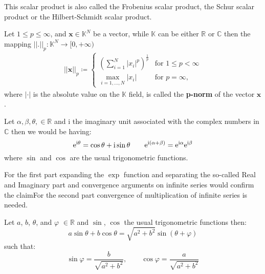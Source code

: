\noindent This scalar product is also called the Frobenius scalar product, the Schur scalar product or 
the Hilbert-Schmidt scalar product.

\begin{Def}\label{def:p-norm}
    Let $1 \leq p \leq \infty$, and $\boldsymbol{x} \in \mathbb{K}^N$ be a vector, while $\mathbb{K}$ can be either $\mathbb{R}$ or $\mathbb{C}$ then the mapping $\left|\left| \boldsymbol{.} \right|\right|_p \colon \mathbb{K}^N \to [0,+\infty)$
    \begin{equation}
        \begin{split} 
            \left|\left|\boldsymbol{x}\right|\right|_p \coloneqq    
            \begin{cases}
                \left(\sum_{i=1}^{N}\left|x_i\right|^p\right)^{\frac{1}{p}} & \text{for } 1 \leq p < \infty\\
                \underset{{i=1,\dots,N}}{\max} \left|x_i\right| & \text{for } p = \infty,
            \end{cases}
        \end{split}
    \end{equation}
    where $\left|\boldsymbol{\cdot}\right|$ is the absolute value on the $\mathbb{K}$ field,
    is called the \textbf{p-norm} of the vector $\boldsymbol{x}$.
\end{Def}
\begin{Thm}\label{theorem:euler_formula}
    Let $\alpha,\beta,\theta, \in \mathbb{R}$ and $\mathrm{i}$ the imaginary unit associated with the complex numbers in $\mathbb{C}$ 
    then we would be having:
	\begin{equation}
		\mathrm{e}^{\mathrm{i}\theta} = \cos \theta +  \mathrm{i}\sin \theta \qquad  \mathrm{e}^{\mathrm{i}(\alpha+\beta)} = \mathrm{e}^{\mathrm{i}\alpha}\mathrm{e}^{\mathrm{i}\beta}\index{Euler formula}\index{Function!$\exp$}\index{Function!$\sin$}\index{Function!$\cos$}
	\end{equation}
    where $\sin$ and $\cos$ are the usual trigonometric functions.
	\end{Thm}
	\begin{Rem}
	For the first part expanding the $\exp$ function and separating the so-called Real and Imaginary part and convergence arguments 
	on infinite series would confirm the claim\cite{Rudin1976}For the second part 
	convergence of multiplication of infinite series is needed.
	\end{Rem}
	\begin{Lem}
		Let $a$, $b$, $\theta$, and $\varphi$ $\in \mathbb{R}$ and $\sin$, $\cos$ 
        the usual trigonometric functions then:
		\begin{equation}
			a\sin \theta+b\cos \theta  = \sqrt{a^2+b^2}\sin(\theta + \varphi)
		\end{equation}
		such that:
		\begin{equation}
			\sin\varphi=\frac{b}{\sqrt{a^2+b^2}}, \qquad \cos\varphi = \frac{a}{\sqrt{a^2+b^2}}
		\end{equation}
		\end{Lem}


